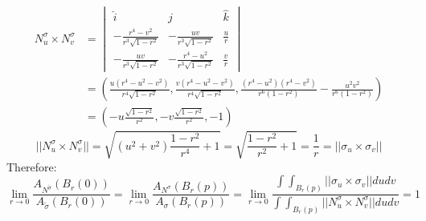 \documentclass{article}
\begin{document}
\begin{enumerate}
            \begin{align*}
                N^\sigma_u\times N^\sigma_v&=
                \begin{vmatrix}
                    \hat{i} &\hat{j} &\hat{k}\\
                    -\frac{r^4-v^2}{r^3\sqrt{1-r^2}} &-\frac{uv}{r^3\sqrt{1-r^2}} &\frac{u}{r}\\
                    -\frac{uv}{r^3\sqrt{1-r^2}} &-\frac{r^4-u^2}{r^3\sqrt{1-r^2}} &\frac{v}{r}
                \end{vmatrix}\\
                &=\left(\frac{u(r^4-u^2-v^2)}{r^4\sqrt{1-r^2}},\frac{v(r^4-u^2-v^2)}{r^4\sqrt{1-r^2}},\frac{(r^4-u^2)(r^4-v^2)}{r^6(1-r^2)}-\frac{u^2v^2}{r^6(1-r^2)}\right)\\
                &=\left(-u\frac{\sqrt{1-r^2}}{r^2},-v\frac{\sqrt{1-r^2}}{r^2},-1 \right)
            \end{align*}
            $$||N^\sigma_u\times N^\sigma_v||=\sqrt{(u^2+v^2)\frac{{1-r^2}}{r^4}+1}=\sqrt{\frac{1-r^2}{r^2}+1}=\frac{1}{r}=||\sigma_u\times \sigma_v||$$
            Therefore:
            $$\lim_{r\to 0}\frac{A_{N^{\tilde{\sigma}}}(B_r(0))}{A_{\tilde\sigma}(B_r(0))}=\lim_{r\to 0}\frac{A_{N^\sigma}(B_r(p))}{A_\sigma(B_r(p))}=\lim_{r\to 0}\frac{\int\int_{B_r(p)}||\sigma_u\times\sigma_v||dudv}{\int\int_{B_r(p)}||N^\sigma_u\times N^\sigma_v||dudv}=1$$
\end{enumerate}
\end{document}
